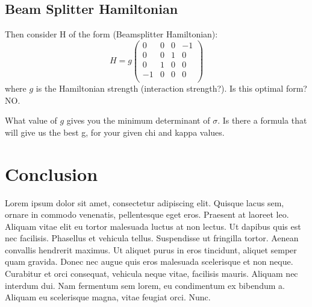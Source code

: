 \documentclass[11pt,a4paper]{article}
\numberwithin{equation}{section}
\begin{document}
	\subsection{Beam Splitter Hamiltonian}

	
	Then consider H of the form (Beamsplitter Hamiltonian):
	\begin{equation*}
	H = g\begin{pmatrix}
	0 & 0 & 0 & -1\\
	0 & 0 & 1 & 0\\
	0 & 1 & 0 & 0 \\
	-1 & 0 & 0 & 0 \\
	\end{pmatrix}
	\end{equation*} where $g$ is the Hamiltonian strength (interaction strength?). Is this optimal form? NO.
	
	What value of $g$ gives you the minimum determinant of $\sigma$. Is there a formula that will give us the best g, for your given chi and kappa values. 
	\fi	

	\color{red}\section{Conclusion}
	\label{sec:conc}
	
	Lorem ipsum dolor sit amet, consectetur adipiscing elit. Quisque lacus sem, ornare in commodo venenatis, pellentesque eget eros. Praesent at laoreet leo. Aliquam vitae elit eu tortor malesuada luctus at non lectus. Ut dapibus quis est nec facilisis. Phasellus et vehicula tellus. Suspendisse ut fringilla tortor. Aenean convallis hendrerit maximus. Ut aliquet purus in eros tincidunt, aliquet semper quam gravida. Donec nec augue quis eros malesuada scelerisque et non neque. Curabitur et orci consequat, vehicula neque vitae, facilisis mauris. Aliquam nec interdum dui. Nam fermentum sem lorem, eu condimentum ex bibendum a. Aliquam eu scelerisque magna, vitae feugiat orci. Nunc.
	\color{black}
\end{document}
